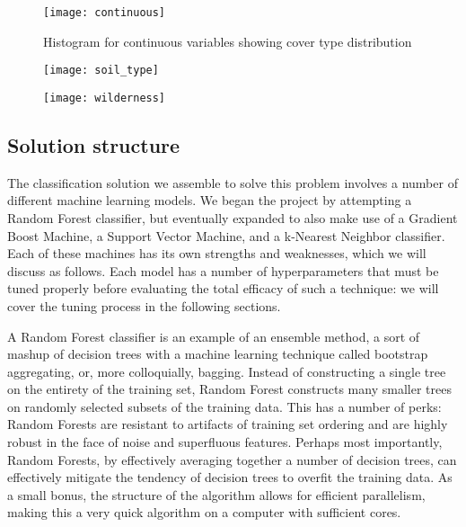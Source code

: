 \begin{figure*}
\centering
\texttt{[image: continuous]}
 \caption{Histogram for continuous variables showing cover type distribution}
 \label{fig:continuous_features}
\end{figure*}

\begin{figure*}[b]
\centering
\begin{minipage}{.5\textwidth}
  \centering
  \texttt{[image: soil\_type]}
  \label{fig:soil}
\end{minipage}%
\begin{minipage}{.5\textwidth}
  \centering
  \texttt{[image: wilderness]}
  \label{fig:wilderness}
\end{minipage}
\end{figure*}



\subsection{Solution structure}
The classification solution we assemble to solve this problem involves 
a number of different machine learning models.  We began the project by 
attempting a Random Forest classifier, but eventually expanded to also 
make use of a Gradient Boost Machine, a Support Vector Machine, and a 
k-Nearest Neighbor classifier.  Each of these machines has its own 
strengths and weaknesses, which we will discuss as follows.  Each model 
has a number of hyperparameters that must be tuned properly before 
evaluating the total efficacy of such a technique: we will cover the 
tuning process in the following sections.

A Random Forest classifier\cite{breiman2001random} is an example of an 
ensemble method, a sort of mashup of decision trees with a machine 
learning technique called bootstrap aggregating, or, more colloquially, 
bagging\cite{bagging}.  Instead of constructing a single tree on the 
entirety of the training set, Random Forest constructs many smaller 
trees on randomly selected subsets of the training data.  This has a 
number of perks: Random Forests are resistant to artifacts of training 
set ordering and are highly robust in the face of noise and superfluous 
features.  Perhaps most importantly, Random Forests, by effectively 
averaging together a number of decision trees, can effectively mitigate 
the tendency of decision trees to overfit the training data.  As a 
small bonus, the structure of the algorithm allows for efficient 
parallelism, making this a very quick algorithm on a computer with 
sufficient cores.

